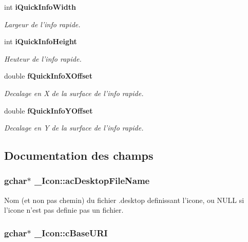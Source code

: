 \begin{CompactItemize}
int {\bf iQuickInfoWidth}
\begin{CompactList}\small\item\em Largeur de l'info rapide. \item\end{CompactList}\item 
int {\bf iQuickInfoHeight}
\begin{CompactList}\small\item\em Heuteur de l'info rapide. \item\end{CompactList}\item 
double {\bf fQuickInfoXOffset}
\begin{CompactList}\small\item\em Decalage en X de la surface de l'info rapide. \item\end{CompactList}\item 
double {\bf fQuickInfoYOffset}
\begin{CompactList}\small\item\em Decalage en Y de la surface de l'info rapide. \item\end{CompactList}\end{CompactItemize}


\subsection{Documentation des champs}
\subsubsection{\setlength{\rightskip}{0pt plus 5cm}gchar$\ast$ {\bf \_\-Icon::acDesktopFileName}}\label{struct__Icon_5f3113020e0305c64fe6b6e87002b0fb}


Nom (et non pas chemin) du fichier .desktop definissant l'icone, ou NULL si l'icone n'est pas definie pas un fichier. 

\subsubsection{\setlength{\rightskip}{0pt plus 5cm}gchar$\ast$ {\bf \_\-Icon::cBaseURI}}\label{struct__Icon_48bf6db71b3512a68496eaf7aaf9a368}


